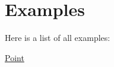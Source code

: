 \section{Examples}
Here is a list of all examples\+:\begin{DoxyCompactItemize}
\item 
\hyperlink{Point-example}{Point}
\end{DoxyCompactItemize}
